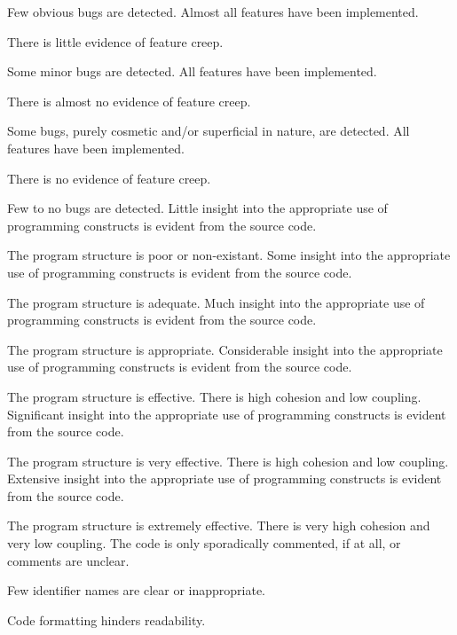 \documentclass{../fal_assignment}
\begin{document}
\begin{markingrubric}
            \par Few obvious bugs  are detected.
        \grade Almost all features have been implemented.
            \par There is little evidence of feature creep.
            \par Some minor bugs  are detected.
        \grade All features have been implemented.
            \par There is almost no evidence of feature creep.
            \par Some bugs, purely cosmetic and/or superficial in nature, are detected.
        \grade All features have been implemented.
            \par There is no evidence of feature creep.
            \par Few to no bugs are detected.
%
        \grade \fail Little insight into the appropriate use of programming constructs is evident from the source code.
            \par The program structure is poor or non-existant.
        \grade Some insight into the appropriate use of programming constructs is evident from the source code.
            \par The program structure is adequate.
        \grade Much insight into the appropriate use of programming constructs is evident from the source code.
            \par The program structure is appropriate.
        \grade Considerable insight into the appropriate use of programming constructs is evident from the source code.
            \par The program structure is effective. There is high cohesion and low coupling.
        \grade Significant insight into the appropriate use of programming constructs is evident from the source code.
            \par The program structure is very effective. There is high cohesion and low coupling.
        \grade Extensive insight into the appropriate use of programming constructs is evident from the source code.
            \par The program structure is extremely effective. There is very high cohesion and very low coupling.
%
        \grade \fail The code is only sporadically commented, if at all, or comments are unclear.
            \par Few identifier names are clear or inappropriate.
            \par Code formatting hinders readability.

\end{markingrubric}
\end{document}
